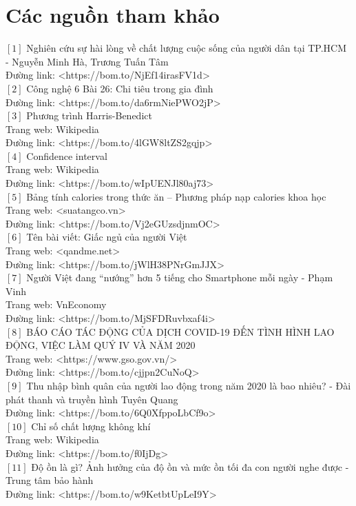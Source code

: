 \section{Các nguồn tham khảo}
$[1]$ Nghiên cứu sự hài lòng về chất lượng cuộc sống của người dân tại TP.HCM - Nguyễn Minh Hà, Trương Tuấn Tâm\\
Đường link: <https://bom.to/NjEf14irasFV1d>\\
$[2]$ Công nghệ 6 Bài 26: Chi tiêu trong gia đình\\
Đường link: <https://bom.to/da6rmNiePWO2jP>\\
$[3]$ Phương trình Harris-Benedict\\
Trang web: Wikipedia\\
Đường link: <https://bom.to/4lGW8ltZS2gqjp>\\
$[4]$ Confidence interval\\
Trang web: Wikipedia\\
Đường link: <https://bom.to/wIpUENJl80aj73>\\
$[5]$ Bảng tính calories trong thức ăn – Phương pháp nạp calories khoa học\\
Trang web: <suatangco.vn>\\
Đường link: <https://bom.to/Vj2eGUzsdjnmOC>\\
$[6]$ Tên bài viết: Giấc ngủ của người Việt\\
Trang web: <qandme.net>\\
Đường link: <https://bom.to/jWlH38PNrGmJJX>\\
$[7]$ Người Việt đang “nướng” hơn 5 tiếng cho Smartphone mỗi ngày - Phạm Vinh\\
Trang web:  VnEconomy\\
Đường link: <https://bom.to/MjSFDRuvbxaf4i>\\
$[8]$ BÁO CÁO TÁC ĐỘNG CỦA DỊCH COVID-19 ĐẾN TÌNH HÌNH LAO ĐỘNG, VIỆC LÀM QUÝ IV VÀ NĂM 2020\\
Trang web: <https://www.gso.gov.vn/>\\
Đường link: <https://bom.to/cjjpn2CuNoQ>\\
$[9]$ Thu nhập bình quân của người lao động trong năm 2020 là bao nhiêu? - Đài phát thanh và truyền hình Tuyên Quang\\
Đường link: <https://bom.to/6Q0XfppoLbCf9o>\\
$[10]$ Chỉ số chất lượng không khí\\
Trang web: Wikipedia\\
Đường link: <https://bom.to/f0IjDg>\\
$[11]$ Độ ồn là gì? Ảnh hưởng của độ ồn và mức ồn tối đa con người nghe được - Trung tâm bảo hành\\
Đường link: <https://bom.to/w9KetbtUpLeI9Y>\\

